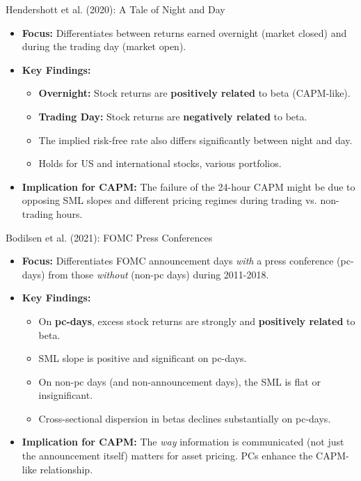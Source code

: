 \documentclass[10pt]{beamer}
\begin{document}
\begin{frame}{Hendershott et al. (2020): A Tale of Night and Day}
  \begin{itemize}
    \item \textbf{Focus:} Differentiates between returns earned overnight (market closed) and during the trading day (market open).
    \item \textbf{Key Findings:}
    \begin{itemize}
        \item \textbf{Overnight:} Stock returns are \textbf{positively related} to beta (CAPM-like).
        \item \textbf{Trading Day:} Stock returns are \textbf{negatively related} to beta.
        \item The implied risk-free rate also differs significantly between night and day.
        \item Holds for US and international stocks, various portfolios.
    \end{itemize}
    \item \textbf{Implication for CAPM:} The failure of the 24-hour CAPM might be due to opposing SML slopes and different pricing regimes during trading vs. non-trading hours.
  \end{itemize}
\end{frame}

\begin{frame}{Bodilsen et al. (2021): FOMC Press Conferences}
  \begin{itemize}
    \item \textbf{Focus:} Differentiates FOMC announcement days \textit{with} a press conference (pc-days) from those \textit{without} (non-pc days) during 2011-2018.
    \item \textbf{Key Findings:}
    \begin{itemize}
        \item On \textbf{pc-days}, excess stock returns are strongly and \textbf{positively related} to beta.
        \item SML slope is positive and significant on pc-days.
        \item On non-pc days (and non-announcement days), the SML is flat or insignificant.
        \item Cross-sectional dispersion in betas declines substantially on pc-days.
    \end{itemize}
    \item \textbf{Implication for CAPM:} The \textit{way} information is communicated (not just the announcement itself) matters for asset pricing. PCs enhance the CAPM-like relationship.
  \end{itemize}
\end{frame}
\end{document}
